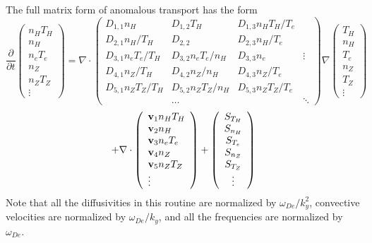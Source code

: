 The full matrix form of anomalous transport has the form
$$ \frac{\partial}{\partial t}
 \left( \begin{array}{c} n_H T_H  \\ n_H \\ n_e T_e \\
    n_Z \\ n_Z T_Z \\ \vdots
    \end{array} \right)
 = \nabla \cdot
\left( \begin{array}{llll}
D_{1,1} n_H & D_{1,2} T_H & D_{1,3} n_H T_H / T_e \\
D_{2,1} n_H / T_H & D_{2,2} & D_{2,3} n_H / T_e \\
D_{3,1} n_e T_e / T_H & D_{3,2} n_e T_e / n_H & D_{3,3} n_e & \vdots \\
D_{4,1} n_Z / T_H & D_{4,2} n_Z / n_H & D_{4,3} n_Z / T_e \\
D_{5,1} n_Z T_Z / T_H & D_{5,2} n_Z T_Z / n_H &
        D_{5,3} n_Z T_Z / T_e \\
 & \ldots & & \ddots
\end{array} \right)
 \nabla
 \left( \begin{array}{c}  T_H \\ n_H \\  T_e \\
   n_Z \\  T_Z \\ \vdots
    \end{array} \right)
$$
$$
 + \nabla \cdot
\left( \begin{array}{l} {\bf v}_1 n_H T_H \\ {\bf v}_2 n_H \\
   {\bf v}_3 n_e T_e \\
   {\bf v}_4 n_Z \\ {\bf v}_5 n_Z T_Z \\ \vdots \end{array} \right) +
 \left( \begin{array}{c} S_{T_H} \\ S_{n_H} \\ S_{T_e} \\
    S_{n_Z} \\ S_{T_Z} \\ \vdots
    \end{array} \right) $$
Note that all the diffusivities in this routine are normalized by
$ \omega_{De} / k_y^2 $,
convective velocities are normalized by $ \omega_{De} / k_y $,
and all the frequencies are normalized by $ \omega_{De} $.

